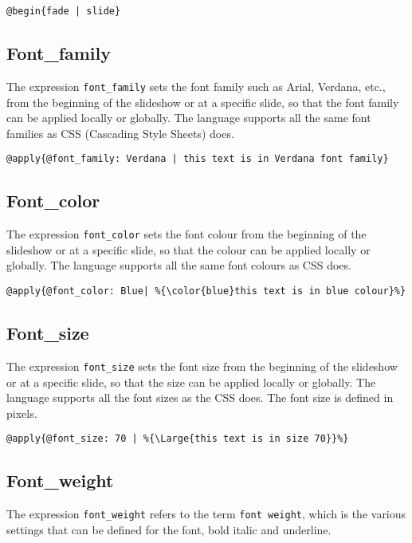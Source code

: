 \begin{lstlisting}[frame=single]
	@begin{fade | slide}
\end{lstlisting}

\subsection{Font\_family}
The expression \texttt{font\_family} sets the font family such as Arial, Verdana, etc., from the beginning of the slideshow or at a specific slide, so that the font family can be applied locally or globally. The language supports all the same font families as CSS (Cascading Style Sheets) does.

\begin{lstlisting}[frame=single]
	@apply{@font_family: Verdana | this text is in Verdana font family}
\end{lstlisting}


\subsection{Font\_color}
The expression \texttt{font\_color} sets the font colour from the beginning of the slideshow or at a specific slide, so that the colour can be applied locally or globally. The language supports all the same font colours as CSS does.

\begin{lstlisting}[frame=single]
	@apply{@font_color: Blue| %{\color{blue}this text is in blue colour}%}
\end{lstlisting}


\subsection{Font\_size}
The expression \texttt{font\_size} sets the font size from the beginning of the slideshow or at a specific slide, so that the size can be applied locally or globally. The language supports all the font sizes as the CSS does. The font size is defined in pixels.

\begin{lstlisting}[frame=single]
	@apply{@font_size: 70 | %{\Large{this text is in size 70}}%}
\end{lstlisting}


\subsection{Font\_weight}
The expression \texttt{font\_weight} refers to the term \texttt{font weight}, which is the various settings that can be defined for the font, bold italic and underline.


